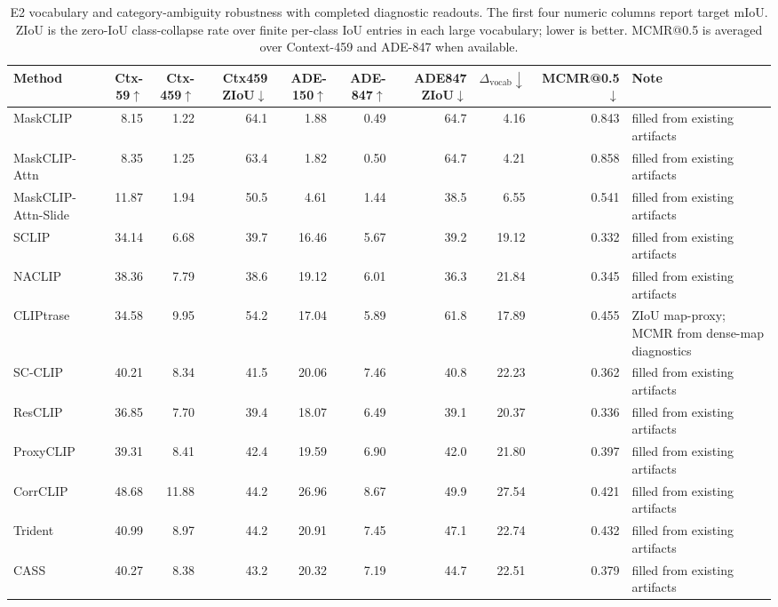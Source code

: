 \begin{table}[t]
\centering
\scriptsize
\caption{E2 vocabulary and category-ambiguity robustness with completed diagnostic readouts. The first four numeric columns report target mIoU. ZIoU is the zero-IoU class-collapse rate over finite per-class IoU entries in each large vocabulary; lower is better. MCMR@0.5 is averaged over Context-459 and ADE-847 when available.}
\label{tab:e2-vocab-robustness-filled}
\setlength{\tabcolsep}{2.5pt}
\begin{adjustbox}{max width=\textwidth}
\begin{tabular}{lrrrrrrrrp{}}
\toprule
Method & Ctx-59$\uparrow$ & Ctx-459$\uparrow$ & Ctx459 ZIoU$\downarrow$ & ADE-150$\uparrow$ & ADE-847$\uparrow$ & ADE847 ZIoU$\downarrow$ & $\Delta_{\mathrm{vocab}}\downarrow$ & MCMR@0.5$\downarrow$ & Note \\
\midrule
MaskCLIP & 8.15 & 1.22 & 64.1 & 1.88 & 0.49 & 64.7 & 4.16 & 0.843 & filled from existing artifacts \\
MaskCLIP-Attn & 8.35 & 1.25 & 63.4 & 1.82 & 0.50 & 64.7 & 4.21 & 0.858 & filled from existing artifacts \\
MaskCLIP-Attn-Slide & 11.87 & 1.94 & 50.5 & 4.61 & 1.44 & 38.5 & 6.55 & 0.541 & filled from existing artifacts \\
SCLIP & 34.14 & 6.68 & 39.7 & 16.46 & 5.67 & 39.2 & 19.12 & 0.332 & filled from existing artifacts \\
NACLIP & 38.36 & 7.79 & 38.6 & 19.12 & 6.01 & 36.3 & 21.84 & 0.345 & filled from existing artifacts \\
CLIPtrase & 34.58 & 9.95 & 54.2 & 17.04 & 5.89 & 61.8 & 17.89 & 0.455 & ZIoU map-proxy; MCMR from dense-map diagnostics \\
SC-CLIP & 40.21 & 8.34 & 41.5 & 20.06 & 7.46 & 40.8 & 22.23 & 0.362 & filled from existing artifacts \\
ResCLIP & 36.85 & 7.70 & 39.4 & 18.07 & 6.49 & 39.1 & 20.37 & 0.336 & filled from existing artifacts \\
ProxyCLIP & 39.31 & 8.41 & 42.4 & 19.59 & 6.90 & 42.0 & 21.80 & 0.397 & filled from existing artifacts \\
CorrCLIP & 48.68 & 11.88 & 44.2 & 26.96 & 8.67 & 49.9 & 27.54 & 0.421 & filled from existing artifacts \\
Trident & 40.99 & 8.97 & 44.2 & 20.91 & 7.45 & 47.1 & 22.74 & 0.432 & filled from existing artifacts \\
CASS & 40.27 & 8.38 & 43.2 & 20.32 & 7.19 & 44.7 & 22.51 & 0.379 & filled from existing artifacts \\

\end{tabular}
\end{adjustbox}
\end{table}
